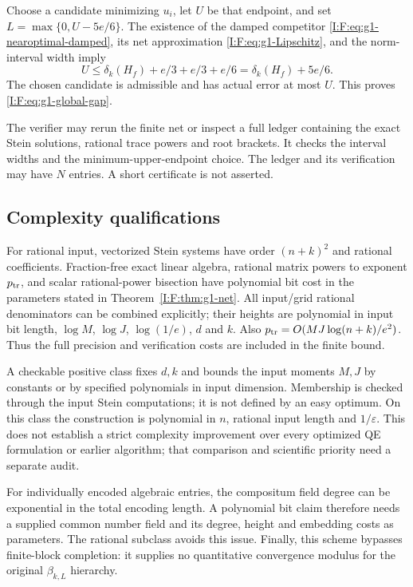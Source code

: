 Choose a candidate minimizing $u_i$, let $U$ be that endpoint, and set
$L=\max\{0,U-5e/6\}$. The existence of the damped competitor
\eqref{I:F:eq:g1-nearoptimal-damped}, its net approximation
\eqref{I:F:eq:g1-Lipschitz}, and the norm-interval width imply
\[
 U\le\delta_k(H_f)+e/3+e/3+e/6
   =\delta_k(H_f)+5e/6.
\]
The chosen candidate is admissible and has actual error at most $U$.
This proves \eqref{I:F:eq:g1-global-gap}.

The verifier may rerun the finite net or inspect a full ledger containing
the exact Stein solutions, rational trace powers and root brackets. It
checks the interval widths and the minimum-upper-endpoint choice. The
ledger and its verification may have $N$ entries. A short certificate is
not asserted.

\subsection{Complexity qualifications}

For rational input, vectorized Stein systems have order $(n+k)^2$ and
rational coefficients. Fraction-free exact linear algebra, rational matrix
powers to exponent $p_{\rm tr}$, and scalar rational-power bisection have
polynomial bit cost in the parameters stated in Theorem~\ref{I:F:thm:g1-net}.
All input/grid rational denominators can be combined explicitly; their
heights are polynomial in input bit length, $\log M$, $\log J$,
$\log(1/e)$, $d$ and $k$. Also
$p_{\rm tr}=O(MJ\log(n+k)/e^2)$. Thus the full precision and verification
costs are included in the finite bound.

A checkable positive class fixes $d,k$ and bounds the input moments $M,J$
by constants or by specified polynomials in input dimension. Membership is
checked through the input Stein computations; it is not defined by an easy
optimum. On this class the construction is polynomial in $n$, rational
input length and $1/\varepsilon$. This does not establish a strict
complexity improvement over every optimized QE formulation or earlier
algorithm; that comparison and scientific priority need a separate audit.

For individually encoded algebraic entries, the compositum field degree
can be exponential in the total encoding length. A polynomial bit claim
therefore needs a supplied common number field and its degree, height and
embedding costs as parameters. The rational subclass avoids this issue.
Finally, this scheme bypasses finite-block completion: it supplies no
quantitative convergence modulus for the original $\beta_{k,L}$ hierarchy.

